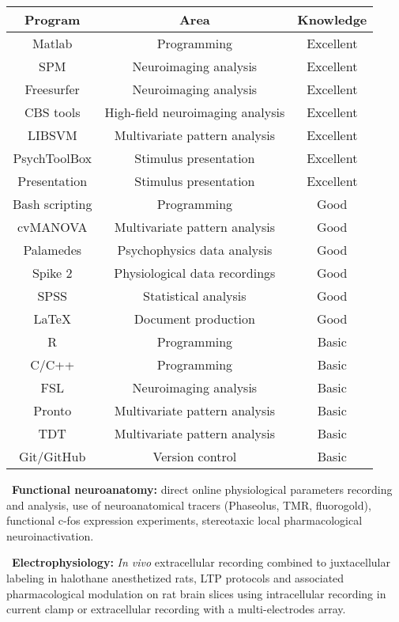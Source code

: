 \documentclass[a4paper,12pt,oneside]{letter}
\begin{document}
{\begin{center}
\begin{tabular}[c]{|c|c|c|}
\hline\hline
Program & Area & Knowledge \\
\hline
Matlab & Programming & Excellent \\ 
SPM & Neuroimaging analysis & Excellent \\
Freesurfer & Neuroimaging analysis & Excellent \\
CBS tools & High-field neuroimaging analysis & Excellent \\
LIBSVM & Multivariate pattern analysis & Excellent \\
PsychToolBox & Stimulus presentation & Excellent \\
Presentation & Stimulus presentation & Excellent \\
Bash scripting & Programming & Good \\
cvMANOVA & Multivariate pattern analysis & Good \\
Palamedes & Psychophysics data analysis & Good \\
Spike 2 & Physiological data recordings & Good \\
SPSS & Statistical analysis & Good \\
\LaTeX & Document production & Good \\
R & Programming & Basic \\
C/C++ & Programming & Basic \\
FSL & Neuroimaging analysis & Basic \\
Pronto & Multivariate pattern analysis & Basic \\
TDT & Multivariate pattern analysis & Basic \\
Git/GitHub & Version control & Basic \\
\hline\hline
\end{tabular} 
\end{center}

\textbullet~\textbf{Functional neuroanatomy:} direct online physiological parameters recording and analysis, use of neuroanatomical tracers (Phaseolus, TMR, fluorogold), functional c-fos expression experiments, stereotaxic local pharmacological neuroinactivation. 

\textbullet~\textbf{Electrophysiology:} \textit{In vivo} extracellular recording combined to juxtacellular labeling in halothane anesthetized rats, LTP protocols and associated pharmacological modulation on rat brain slices using intracellular recording in current clamp or extracellular recording with a multi-electrodes array. 

}
\end{document}
